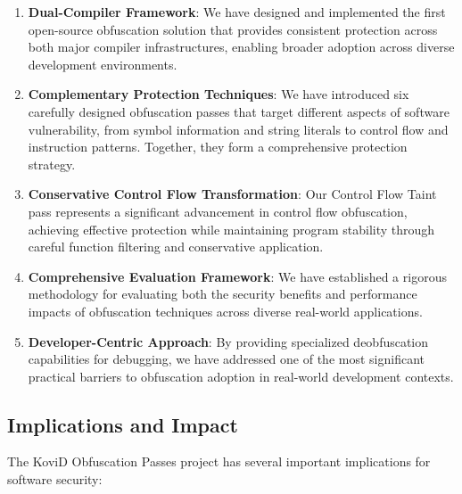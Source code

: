 \documentclass[conference]{IEEEtran}
\begin{document}
\begin{enumerate}
    \item \textbf{Dual-Compiler Framework}: We have designed and implemented the first open-source obfuscation solution that provides consistent protection across both major compiler infrastructures, enabling broader adoption across diverse development environments.
    
    \item \textbf{Complementary Protection Techniques}: We have introduced six carefully designed obfuscation passes that target different aspects of software vulnerability, from symbol information and string literals to control flow and instruction patterns. Together, they form a comprehensive protection strategy.
    
    \item \textbf{Conservative Control Flow Transformation}: Our Control Flow Taint pass represents a significant advancement in control flow obfuscation, achieving effective protection while maintaining program stability through careful function filtering and conservative application.
    
    \item \textbf{Comprehensive Evaluation Framework}: We have established a rigorous methodology for evaluating both the security benefits and performance impacts of obfuscation techniques across diverse real-world applications.
    
    \item \textbf{Developer-Centric Approach}: By providing specialized deobfuscation capabilities for debugging, we have addressed one of the most significant practical barriers to obfuscation adoption in real-world development contexts.
\end{enumerate}

\subsection{Implications and Impact}
The KoviD Obfuscation Passes project has several important implications for software security:
\end{document}
